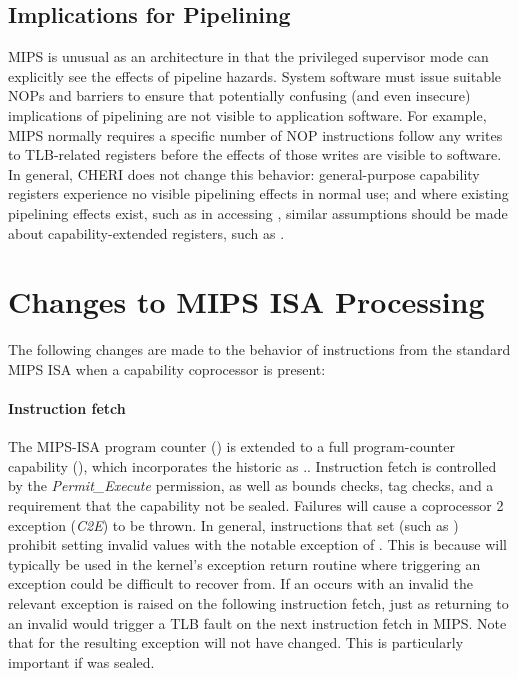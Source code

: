 \subsection{Implications for Pipelining}

MIPS is unusual as an architecture in that the privileged supervisor mode can
explicitly see the effects of pipeline hazards.
System software must issue suitable NOPs and barriers to ensure that
potentially confusing (and even insecure) implications of pipelining are not
visible to application software.
For example, MIPS normally requires a specific number of NOP instructions
follow any writes to TLB-related registers before the effects of those writes
are visible to software.
In general, CHERI does not change this behavior: general-purpose capability
registers experience no visible pipelining effects in normal use; and where
existing pipelining effects exist, such as in accessing \EPC{}, similar
assumptions should be made about capability-extended registers, such as
\EPCC{}.

\section{Changes to MIPS ISA Processing}
\label{changes-to-MIPS-ISA}


The following changes are made to the behavior of instructions from the
standard MIPS ISA when a capability coprocessor is present:

\paragraph{Instruction fetch}
The MIPS-ISA program counter (\PC{}) is extended to a full program-counter
capability (\PCC{}), which incorporates the historic \PC{} as
\PCC{}.\coffset{}.
Instruction fetch is controlled by the \emph{Permit\_Execute} permission, as
well as bounds checks, tag checks, and a requirement that the capability not
be sealed.
Failures will cause a coprocessor 2 exception (\textit{C2E}) to be thrown.
In general, instructions that set \PCC{} (such as ) prohibit
setting invalid values with the notable exception of .
This is because  will typically be used in the kernel's
exception return routine where triggering an exception could be difficult
to recover from.
If an  occurs with an invalid \EPCC{} the relevant exception is raised
on the following instruction fetch, just as returning to an invalid \PC{} would
trigger a TLB fault on the next instruction fetch in MIPS.
Note that \EPCC{} for the resulting exception will not have changed. This is particularly
important if \EPCC{} was sealed.

